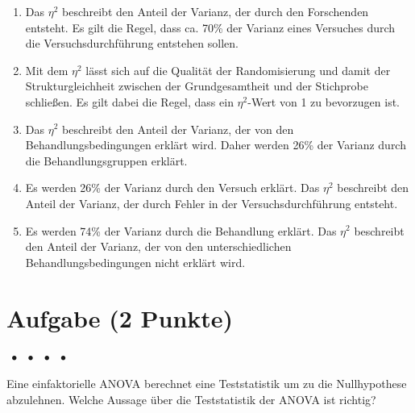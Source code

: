 \documentclass[a4paper, 9pt]{scrartcl}\usepackage[]{graphicx}\usepackage[]{xcolor}
\begin{document}
\begin{enumerate}
\item [\textbf{A} \msquare] Das $\eta^2$ beschreibt den Anteil der Varianz, der durch den Forschenden entsteht. Es gilt die Regel, dass ca. 70\% der Varianz eines Versuches durch die Versuchsdurchführung entstehen sollen.
\item [\textbf{B} \msquare] Mit dem $\eta^2$ lässt sich auf die Qualität der Randomisierung und damit der Strukturgleichheit zwischen der Grundgesamtheit und der Stichprobe schließen. Es gilt dabei die Regel, dass ein $\eta^2$-Wert von 1 zu bevorzugen ist.
\item [\textbf{C} \msquare] Das $\eta^2$ beschreibt den Anteil der Varianz, der von den Behandlungsbedingungen erklärt wird. Daher werden 26\% der Varianz durch die Behandlungsgruppen erklärt.
\item [\textbf{D} \msquare] Es werden 26\% der Varianz durch den Versuch erklärt. Das $\eta^2$ beschreibt den Anteil der Varianz, der durch Fehler in der Versuchsdurchführung entsteht.
\item [\textbf{E} \msquare] Es werden 74\% der Varianz durch die Behandlung erklärt. Das $\eta^2$ beschreibt den Anteil der Varianz, der von den unterschiedlichen Behandlungsbedingungen nicht erklärt wird.
\end{enumerate}

\section{Aufgabe \hfill (2 Punkte)}

\ifcollection
\begin{flushright}
\tiny\vspace{-2Ex}
\textbf{\examinhaltstart}
\exammodulemathstat $\;\bullet$
\exammodulestat $\;\bullet$
\exammodulestatbbv $\;\bullet$
\exammodulestatversuch $\;\bullet$
\exammodulebiostat
\vspace{-1Ex}
\end{flushright}
\fi




Eine einfaktorielle ANOVA berechnet eine Teststatistik um zu die Nullhypothese abzulehnen. Welche Aussage über die Teststatistik der ANOVA ist richtig?
\end{document}
